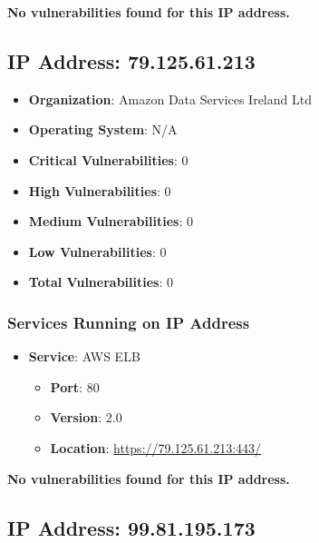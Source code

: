 \documentclass{article}
\begin{document}
\textbf{No vulnerabilities found for this IP address.}




\clearpage



\subsection{IP Address: 79.125.61.213}

\begin{itemize}
    \item \textbf{Organization}: Amazon Data Services Ireland Ltd
    \item \textbf{Operating System}:  N/A 
    \item \textbf{Critical Vulnerabilities}: 0
    \item \textbf{High Vulnerabilities}: 0
    \item \textbf{Medium Vulnerabilities}: 0
    \item \textbf{Low Vulnerabilities}: 0
    \item \textbf{Total Vulnerabilities}: 0
\end{itemize}

\subsubsection*{Services Running on IP Address}

\begin{itemize}
    
        \item \textbf{Service}: AWS ELB
        \begin{itemize}
            \item \textbf{Port}: 80
            \item \textbf{Version}:  2.0 
            \item \textbf{Location}: \href{ https://79.125.61.213:443/ }{ https://79.125.61.213:443/ }
        \end{itemize}
    
\end{itemize}


\textbf{No vulnerabilities found for this IP address.}




\clearpage



\subsection{IP Address: 99.81.195.173}
\end{document}

